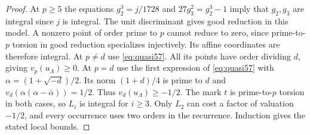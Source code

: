 \documentclass[a4paper,11pt]{article}
\theoremstyle{definition}
\theoremstyle{remark}
\numberwithin{equation}{section}
\begin{document}
\begin{proof}
At \(p\ge5\) the equations \(g_2^3=j/1728\) and
\(27g_3^2=g_2^3-1\) imply that \(g_2,g_3\) are integral since
\(j\) is integral. The unit discriminant gives good reduction in
this model. A nonzero point of order prime to \(p\) cannot reduce
to zero, since prime-to-\(p\) torsion in good reduction specializes
injectively. Its affine coordinates are therefore integral. At
\(p\ne d\) use \eqref{eq:quasi57}. All its points have order
dividing \(d\), giving \(v_p(u_\Lambda)\ge0\). At \(p=d\) use the
first expression of \eqref{eq:quasi57} with
\(\alpha=(1+\sqrt{-d})/2\). Its norm \((1+d)/4\) is prime to \(d\)
and \(v_d(\alpha(\alpha-\bar\alpha))=1/2\). Thus
\(v_d(u_\Lambda)\ge-1/2\). The mark \(t\) is prime-to-\(p\)
torsion in both cases, so \(L_i\) is integral for \(i\ge3\).
Only \(L_2\) can cost a factor of valuation \(-1/2\), and every
occurrence uses two orders in the recurrence. Induction gives
the stated local bounds.
\end{proof}
\end{document}
